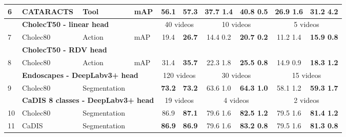 \documentclass[times,twocolumn,final]{elsarticle}
\begin{document}
\begin{table*}[]
\begin{tabular}{llllcccccc}
6                                                     & \cellcolor[HTML]{C0C0C0}CATARACTS   & \cellcolor[HTML]{00D2CB}Tool         & \cellcolor[HTML]{FFCCC9}mAP                        & 56.1                 & \textbf{57.3}        & 37.7  1.4       & \textbf{40.8  0.5} & 26.9  1.6       & \textbf{31.2  4.2} \\\hline
& \multicolumn{3}{l}{\textbf{CholecT50 - linear head}}  & \multicolumn{2}{c}{40 videos} & \multicolumn{2}{c}{10 videos}    & \multicolumn{2}{c}{5 videos}\\
7                                                     & \cellcolor[HTML]{C0C0C0}Cholec80    & \cellcolor[HTML]{00D2CB}Action       & \cellcolor[HTML]{FFCCC9}mAP                        & 19.4                 & \textbf{26.7}        & 14.4  0.2       & \textbf{20.7  0.2} & 11.2  1.4       & \textbf{15.9  0.8} \\
                                                      & \multicolumn{3}{l}{\textbf{CholecT50 - RDV head}}                                                                           &                      & \textbf{}            &                      & \textbf{}               &                      & \textbf{}               \\
8                                                    & \cellcolor[HTML]{C0C0C0}Cholec80    & \cellcolor[HTML]{00D2CB}Action       & \cellcolor[HTML]{FFCCC9}mAP                        & 31.4                 & \textbf{35.7}                 & 22.3  1.8       & \textbf{25.5  0.8}          & 14.9  0.9       & \textbf{18.3  1.2}          \\\hline
& \multicolumn{3}{l}{\textbf{Endoscapes - DeepLabv3+ head}} & \multicolumn{2}{c}{120 videos} & \multicolumn{2}{c}{30 videos}    & \multicolumn{2}{c}{15 videos}   \\
9                                                    & \cellcolor[HTML]{C0C0C0}Cholec80    & \cellcolor[HTML]{00D2CB}Segmentation & \cellcolor[HTML]{FFCCC9}                       & \textbf{73.2}                 & \textbf{73.2}                 & 63.6  1.0       & \textbf{64.3  1.0}          & 58.1  1.2       & \textbf{59.3  1.7}          \\\hline
& \multicolumn{3}{l}{\textbf{CaDIS 8 classes - DeepLabv3+ head}} &  \multicolumn{2}{c}{19 videos} & \multicolumn{2}{c}{4 videos}    & \multicolumn{2}{c}{2 videos} \\
10  & \cellcolor[HTML]{C0C0C0}Cholec80    & \cellcolor[HTML]{00D2CB}Segmentation & \cellcolor[HTML]{FFCCC9} & 86.9 & \textbf{87.1} & 79.6  1.6 & \textbf{82.5  1.2}  & 79.5  1.6 & \textbf{81.4  1.2} \\
11  & \cellcolor[HTML]{C0C0C0}CaDIS & \cellcolor[HTML]{00D2CB}Segmentation & \cellcolor[HTML]{FFCCC9} & \textbf{86.9}& \textbf{86.9} & 79.6  1.6 & \textbf{83.2  0.8} & 79.5  1.6 & \textbf{81.3  0.8}\\                                               



\end{tabular}
\end{table*}
\end{document}
